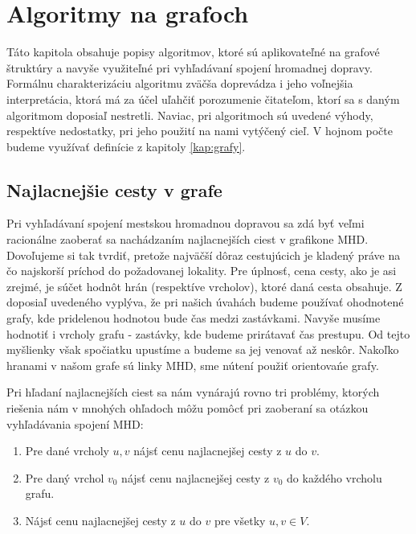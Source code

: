 \chapter{Algoritmy na grafoch}
\label{kap:algoritmy}

Táto kapitola obsahuje popisy algoritmov, ktoré sú aplikovateľné na grafové štruktúry a navyše využiteľné pri vyhľadávaní spojení hromadnej dopravy. Formálnu charakterizáciu algoritmu zväčša doprevádza i jeho voľnejšia interpretácia, ktorá má za účel uľahčiť porozumenie čitateľom, ktorí sa s daným algoritmom doposiaľ nestretli. Naviac, pri algoritmoch sú uvedené výhody, respektíve nedostatky, pri jeho použití na nami vytýčený cieľ. V hojnom počte budeme využívať definície z kapitoly \ref{kap:grafy}.

\section{Najlacnejšie cesty v grafe}

Pri vyhľadávaní spojení mestskou hromadnou dopravou sa zdá byť veľmi racionálne zaoberať sa nachádzaním najlacnejších ciest v grafikone MHD. Dovoľujeme si tak tvrdiť, pretože najväčší dôraz cestujúcich je kladený práve na čo najskorší príchod do požadovanej lokality. Pre úplnosť, cena cesty, ako je asi zrejmé, je súčet hodnôt hrán (respektíve vrcholov), ktoré daná cesta obsahuje. Z doposiaľ uvedeného vyplýva, že pri našich úvahách budeme používať ohodnotené grafy, kde pridelenou hodnotou bude čas medzi zastávkami. Navyše musíme hodnotiť i vrcholy grafu - zastávky, kde budeme prirátavať čas prestupu. Od tejto myšlienky však spočiatku upustíme a budeme sa jej venovať až neskôr. Nakoľko hranami v našom grafe sú linky MHD, sme nútení použiť orientovańe grafy.\newline

Pri hľadaní najlacnejších ciest sa nám vynárajú rovno tri problémy, ktorých riešenia nám v mnohých ohľadoch môžu pomôcť pri zaoberaní sa otázkou vyhľadávania spojení MHD:

\begin{enumerate}
	\item Pre dané vrcholy $u, v$ nájsť cenu najlacnejšej cesty z $u$ do $v$.
	\item Pre daný vrchol $v_{0}$ nájsť cenu najlacnejšej cesty z $v_{0}$ do každého vrcholu grafu.
	\item Nájsť cenu najlacnejšej cesty z $u$ do $v$ pre všetky $u, v \in V$.
\end{enumerate}

